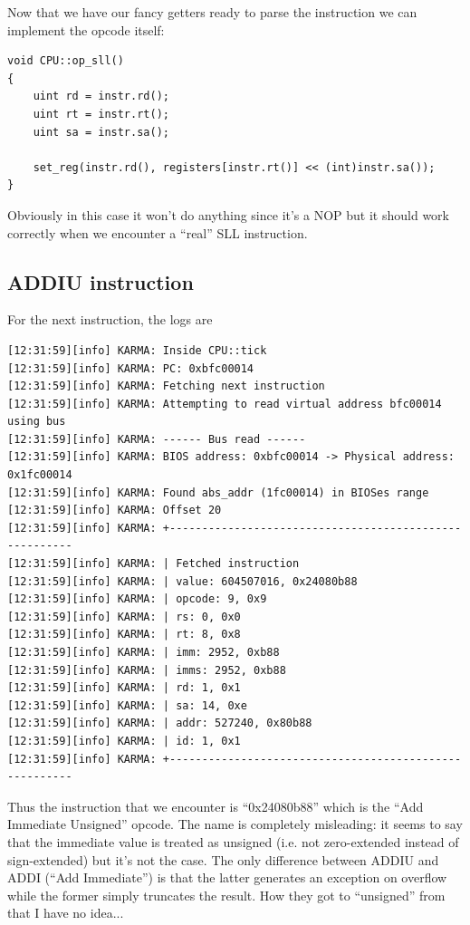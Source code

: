 \documentclass[a4paper]{article}
\begin{document}
Now that we have our fancy getters ready to parse the instruction we
can implement the opcode itself:

\begin{lstlisting}
void CPU::op_sll()
{
	uint rd = instr.rd();
	uint rt = instr.rt();
	uint sa = instr.sa();

	set_reg(instr.rd(), registers[instr.rt()] << (int)instr.sa());
}
\end{lstlisting}

Obviously in this case it won't do anything since it's a NOP but it
should work correctly when we encounter a ``real'' SLL instruction.

\subsection{ADDIU instruction}

For the next instruction, the logs are
\begin{verbatim}
[12:31:59][info] KARMA: Inside CPU::tick
[12:31:59][info] KARMA: PC: 0xbfc00014
[12:31:59][info] KARMA: Fetching next instruction
[12:31:59][info] KARMA: Attempting to read virtual address bfc00014 using bus
[12:31:59][info] KARMA: ------ Bus read ------
[12:31:59][info] KARMA: BIOS address: 0xbfc00014 -> Physical address: 0x1fc00014
[12:31:59][info] KARMA: Found abs_addr (1fc00014) in BIOSes range
[12:31:59][info] KARMA: Offset 20
[12:31:59][info] KARMA: +-------------------------------------------------------
[12:31:59][info] KARMA: | Fetched instruction 
[12:31:59][info] KARMA: | value: 604507016, 0x24080b88
[12:31:59][info] KARMA: | opcode: 9, 0x9
[12:31:59][info] KARMA: | rs: 0, 0x0
[12:31:59][info] KARMA: | rt: 8, 0x8
[12:31:59][info] KARMA: | imm: 2952, 0xb88
[12:31:59][info] KARMA: | imms: 2952, 0xb88
[12:31:59][info] KARMA: | rd: 1, 0x1
[12:31:59][info] KARMA: | sa: 14, 0xe
[12:31:59][info] KARMA: | addr: 527240, 0x80b88
[12:31:59][info] KARMA: | id: 1, 0x1
[12:31:59][info] KARMA: +-------------------------------------------------------
\end{verbatim}

Thus the instruction that we encounter is ``0x24080b88'' which is the
``Add Immediate Unsigned'' opcode. The name is completely misleading: it
seems to say that the immediate value is treated as unsigned (i.e. not
zero-extended instead of sign-extended) but it's not the case. The
only difference between ADDIU and ADDI (``Add Immediate'') is that
the latter generates an exception on overflow while the former simply
truncates the result. How they got to ``unsigned'' from that I have no
idea...
\end{document}
